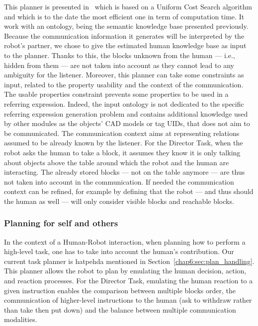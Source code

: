\documentclass[a4paper,11pt,twoside]{StyleThese}
\begin{document}
This planner is presented in~\cite{buisan_2020_efficient} which is based on a Uniform Cost Search algorithm and which is to the date the most efficient one in term of computation time. It work with an ontology, being the semantic knowledge base presented previously. Because the communication information it generates will be interpreted by the robot's partner, we chose to give the estimated human knowledge base as input to the planner. Thanks to this, the blocks unknown from the human --- i.e., hidden from them --- are not taken into account as they cannot lead to any ambiguity for the listener. Moreover, this planner can take some constraints as input, related to the property usability and the context of the communication. The usable properties constraint prevents some properties to be used in a referring expression. Indeed, the input ontology is not dedicated to the specific referring expression generation problem and contains additional knowledge used by other modules as the objects' CAD models or tag UIDs, that does not aim to be communicated. The communication context aims at representing relations assumed to be already known by the listener. For the Director Task, when the robot asks the human to take a block, it assumes they know it is only talking about objects above the table around which the robot and the human are interacting. The already stored blocks --- not on the table anymore --- are thus not taken into account in the communication. If needed the communication context can be refined, for example by defining that the robot --- and thus should the human as well --- will only consider visible blocks and reachable blocks.

\subsubsection{Planning for self and others}

In the context of a Human-Robot interaction, when planning how to perform a high-level task, one has to take into account the human's contribution. Our current task planner is \acrshort{hatpehda} mentioned in Section~\ref{chap6:sec:plan_handling}. This planner allows the robot to plan by emulating the human decision, action, and reaction processes. For the Director Task, emulating the human reaction to a given instruction enables the comparison between multiple blocks order, the communication of higher-level instructions to the human (\eg ask to withdraw rather than take then put down) and the balance between multiple communication modalities.
\end{document}
